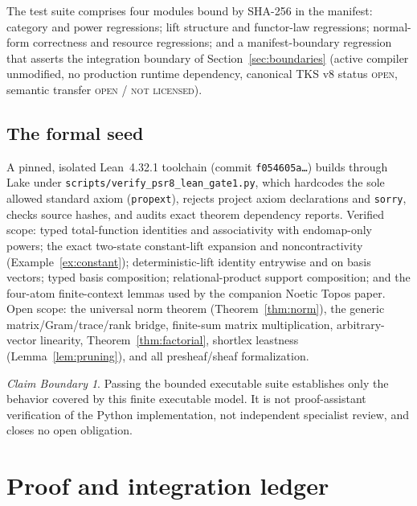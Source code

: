 \documentclass[11pt]{amsart}
\theoremstyle{definition}
\theoremstyle{remark}
\newtheorem{boundary}[theorem]{Claim Boundary}
\begin{document}
The test suite comprises four modules bound by SHA-256 in the manifest: category and power regressions; lift structure and functor-law regressions; normal-form correctness and resource regressions; and a manifest-boundary regression that asserts the integration boundary of Section~\ref{sec:boundaries} (active compiler unmodified, no production runtime dependency, canonical TKS v8 status \textsc{open}, semantic transfer \textsc{open / not licensed}).

\subsection{The formal seed}
A pinned, isolated Lean~4.32.1 toolchain (commit \texttt{f054605a\ldots}) builds through Lake under \texttt{scripts/verify\_psr8\_lean\_gate1.py}, which hardcodes the sole allowed standard axiom (\texttt{propext}), rejects project axiom declarations and \texttt{sorry}, checks source hashes, and audits exact theorem dependency reports. Verified scope: typed total-function identities and associativity with endomap-only powers; the exact two-state constant-lift expansion and noncontractivity (Example~\ref{ex:constant}); deterministic-lift identity entrywise and on basis vectors; typed basis composition; relational-product support composition; and the four-atom finite-context lemmas used by the companion Noetic Topos paper. Open scope: the universal norm theorem (Theorem~\ref{thm:norm}), the generic matrix/Gram/trace/rank bridge, finite-sum matrix multiplication, arbitrary-vector linearity, Theorem~\ref{thm:factorial}, shortlex leastness (Lemma~\ref{lem:pruning}), and all presheaf/sheaf formalization.

\begin{boundary}
Passing the bounded executable suite establishes only the behavior covered by this finite executable model. It is not proof-assistant verification of the Python implementation, not independent specialist review, and closes no open obligation.
\end{boundary}

\section{Proof and integration ledger}\label{sec:ledger}
\end{document}
